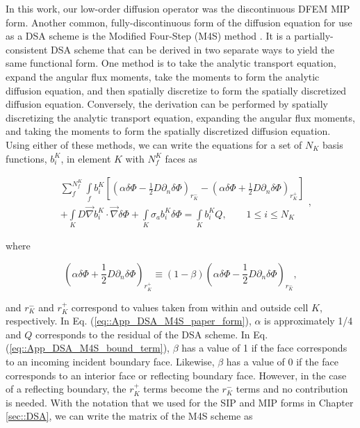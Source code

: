 In this work, our low-order diffusion operator was the discontinuous DFEM MIP form. Another common, fully-discontinuous form of the diffusion equation for use as a DSA scheme is the Modified Four-Step (M4S) method \cite{ref::dsa_DFEM_adams_martin}. It is a partially-consistent DSA scheme that can be derived in two separate ways to yield the same functional form. One method is to take the analytic transport equation, expand the angular flux moments, take the moments to form the analytic diffusion equation, and then spatially discretize to form the spatially discretized diffusion equation. Conversely, the derivation can be performed by spatially discretizing the analytic transport equation, expanding the angular flux moments, and taking the moments to form the spatially discretized diffusion equation. Using either of these methods, we can write the equations for a set of $N_K$ basis functions, $b_i^K$, in element $K$ with $N_f^K$ faces as

\begin{equation}
\label{eq::App_DSA_M4S_paper_form}
\begin{aligned}
&\sum_{f}^{N_f^K} \int\limits_{f} b_i^K \left[  \left(  \alpha \delta \Phi - \frac{1}{2} D \partial_n \delta \Phi \right)_{r_K^-} - \left(  \alpha \delta \Phi + \frac{1}{2} D \partial_n \delta \Phi \right)_{r_K^+} \right] \\
&+ \int\limits_{K} D \vec{\nabla} b_i^K \cdot \vec{\nabla} \delta \Phi + \int\limits_{K} \sigma_a  b_i^K \delta \Phi = \int\limits_{K}  b_i^K Q , \qquad 1 \leq i \leq N_K
\end{aligned},
\end{equation}

\noindent where 

\begin{equation}
\label{eq::App_DSA_M4S_bound_term}
\left(  \alpha \delta \Phi + \frac{1}{2} D \partial_n \delta \Phi \right)_{r_K^+} \equiv \left(  1 - \beta \right)  \left(  \alpha \delta \Phi - \frac{1}{2} D \partial_n \delta \Phi \right)_{r_K^-} ,
\end{equation}

\noindent and $r_K^-$ and $r_K^+$ correspond to values taken from within and outside cell $K$, respectively. In Eq. (\ref{eq::App_DSA_M4S_paper_form}), $\alpha$ is approximately 1/4 and $Q$ corresponds to the residual of the DSA scheme. In Eq. (\ref{eq::App_DSA_M4S_bound_term}), $\beta$ has a value of 1 if the face corresponds to an incoming incident boundary face. Likewise, $\beta$ has a value of 0 if the face corresponds to an interior face or reflecting boundary face. However, in the case of a reflecting boundary, the $r_K^+$ terms become the $r_K^-$ terms and no contribution is needed. With the notation that we used for the SIP and MIP forms in Chapter \ref{sec::DSA}, we can write the matrix of the M4S scheme as 

